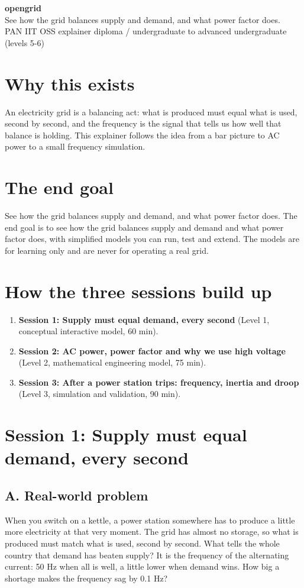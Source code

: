 \documentclass[11pt,a4paper]{article}
\begin{document}
\begin{center}{\LARGE\bfseries opengrid}\\[0.4em]{\large See how the grid balances supply and demand, and what power factor does.}\\[0.2em]\small PAN IIT OSS explainer \textbullet{} diploma / undergraduate to advanced undergraduate (levels 5-6)\end{center}

\section*{Why this exists}
An electricity grid is a balancing act: what is produced must equal what is used, second by second, and the frequency is the signal that tells us how well that balance is holding. This explainer follows the idea from a bar picture to AC power to a small frequency simulation.

\section*{The end goal}
See how the grid balances supply and demand, and what power factor does. The end goal is to see how the grid balances supply and demand and what power factor does, with simplified models you can run, test and extend. The models are for learning only and are never for operating a real grid.

\section*{How the three sessions build up}
\begin{enumerate}[nosep]
\item \textbf{Session 1: Supply must equal demand, every second} (Level 1, conceptual interactive model, 60 min).
\item \textbf{Session 2: AC power, power factor and why we use high voltage} (Level 2, mathematical engineering model, 75 min).
\item \textbf{Session 3: After a power station trips: frequency, inertia and droop} (Level 3, simulation and validation, 90 min).
\end{enumerate}

\section{Session 1: Supply must equal demand, every second}

\subsection*{A. Real-world problem}
When you switch on a kettle, a power station somewhere has to produce a little more electricity at that very moment. The grid has almost no storage, so what is produced must match what is used, second by second. What tells the whole country that demand has beaten supply? It is the frequency of the alternating current: 50 Hz when all is well, a little lower when demand wins. How big a shortage makes the frequency sag by 0.1 Hz?
\end{document}
